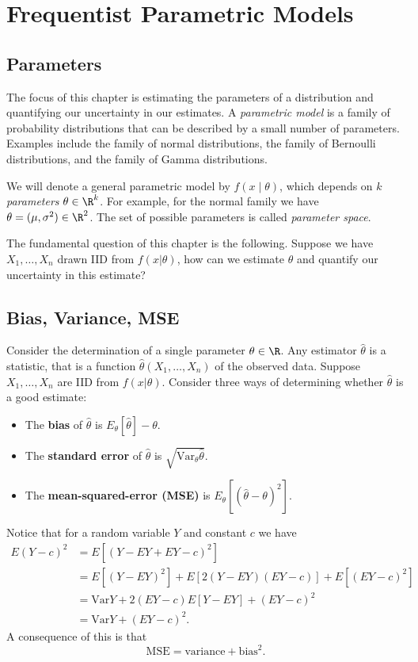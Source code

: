 \chapter{Frequentist Parametric Models}
\section{Parameters}
The focus of this chapter is estimating the parameters of a distribution and quantifying our uncertainty in our estimates. A {\it parametric model} is a family of probability distributions that can be described by a small number of parameters. Examples include the family of normal distributions, the family of Bernoulli distributions, and the family of Gamma distributions. 

We will denote a general parametric model by $f(x\mid\theta)$, which depends on $k$ {\it parameters} $\theta\in\R^k$. For example, for the normal family we have $\theta=(\mu, \sigma^2)\in\R^2$. The set of possible parameters is called {\it parameter space}. 

The fundamental question of this chapter is the following. Suppose we have $X_1, \dots, X_n$ drawn IID from $f(x|\theta)$, how can we estimate $\theta$ and quantify our uncertainty in this estimate? 

\section{Bias, Variance, MSE}
Consider the determination of a single parameter $\theta\in\R$. Any estimator $\hat{\theta}$ is a statistic, that is a function $\hat{\theta}(X_1, \dots, X_n)$ of the observed data. Suppose $X_1, \dots, X_n$ are IID from $f(x|\theta)$. Consider three ways of determining whether $\hat{\theta}$ is a good estimate: 
\begin{itemize}
    \item The {\bf bias} of $\hat{\theta}$ is $E_\theta[\hat{\theta}]-\theta$. 
    \item The {\bf standard error} of $\hat{\theta}$ is $\sqrt{\mathrm{Var}_\theta \hat{\theta}}$. 
    \item The {\bf mean-squared-error (MSE)} is $E_\theta[(\hat{\theta}-\theta)^2]$. 
\end{itemize}
Notice that for a random variable $Y$ and constant $c$ we have 
\begin{align*}
    E(Y-c)^2 &= E[(Y-EY + EY - c)^2]\\
             &= E[(Y-EY)^2]+E[2(Y-EY)(EY-c)] + E[(EY-c)^2]\\
             &= \mathrm{Var}Y + 2(EY-c)E[Y-EY] + (EY-c)^2\\
             &= \mathrm{Var}Y + (EY-c)^2. 
\end{align*}
A consequence of this is that 
\[\mathrm{MSE} = \mathrm{variance} + \mathrm{bias}^2. \]


